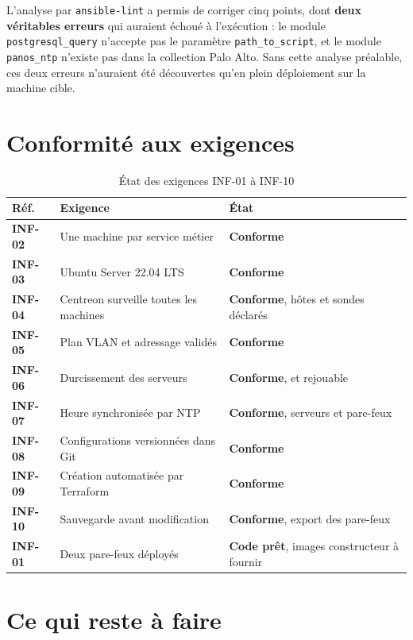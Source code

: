 \documentclass[11pt,a4paper]{article}
\newcommand{\ttb}[1]{\texttt{\small #1}}
\newcommand{\rid}[1]{\textcolor{primary}{\textbf{\small #1}}}
\newcommand{\ok}{\textcolor{okgreen}{\textbf{Conforme}}}
\begin{document}
L'analyse par \ttb{ansible-lint} a permis de corriger cinq points, dont
\textbf{deux véritables erreurs} qui auraient échoué à l'exécution : le module
\ttb{postgresql\_query} n'accepte pas le paramètre \ttb{path\_to\_script}, et le
module \ttb{panos\_ntp} n'existe pas dans la collection Palo Alto. Sans cette
analyse préalable, ces deux erreurs n'auraient été découvertes qu'en plein
déploiement sur la machine cible.

\section{Conformité aux exigences}

\begin{table}[H]
\centering
\caption{État des exigences INF-01 à INF-10}
\begin{tabularx}{\textwidth}{L{1.6cm} Y L{3.4cm}}
\toprule
{}\textbf{Réf.} & \textbf{Exigence} & \textbf{État} \\
\midrule
\rid{INF-02} & Une machine par service métier & \ok \\
\rid{INF-03} & Ubuntu Server 22.04 LTS & \ok \\
\rid{INF-04} & Centreon surveille toutes les machines & \ok, hôtes et sondes déclarés \\
\rid{INF-05} & Plan VLAN et adressage validés & \ok \\
\rid{INF-06} & Durcissement des serveurs & \ok, et rejouable \\
\rid{INF-07} & Heure synchronisée par NTP & \ok, serveurs et pare-feux \\
\rid{INF-08} & Configurations versionnées dans Git & \ok \\
\rid{INF-09} & Création automatisée par Terraform & \ok \\
\rid{INF-10} & Sauvegarde avant modification & \ok, export des pare-feux \\
\midrule
\rid{INF-01} & Deux pare-feux déployés & \textcolor{warn}{\textbf{Code prêt}}, images constructeur à fournir \\
\bottomrule
\end{tabularx}
\end{table}

\section{Ce qui reste à faire}
\end{document}
